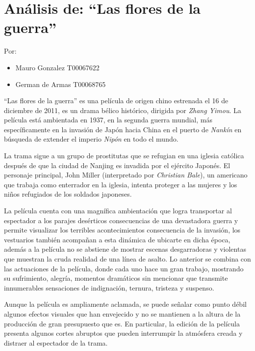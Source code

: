 \documentclass[letterpaper, 12pt]{report}
\begin{document}
\chapter*{Análisis de: ``Las flores de la guerra''}

\noindent\makebox[\linewidth]{\rule{\textwidth}{0.4pt}}

Por:
\begin{itemize}[label=$\triangleright$]
    \item Mauro Gonzalez T00067622
    \item German de Armas T00068765
\end{itemize}

\noindent\makebox[\linewidth]{\rule{\textwidth}{0.4pt}}

\nocite{Pelicula}

``Las flores de la guerra'' es una película de origen chino estrenada el 16 de
diciembre de 2011, es un drama bélico histórico, dirigida por \textit{Zhang Yimou}.
La película está ambientada en 1937, en la segunda guerra mundial, más
específicamente en la invasión de Japón hacia China en el puerto de
\textit{Nankín} en búsqueda de extender el imperio \textit{Nipón} en todo el mundo.

La trama sigue a un grupo de prostitutas que se refugian en
una iglesia católica después de que la ciudad de Nanjing es
invadida por el ejército Japonés. El personaje principal,
John Miller (interpretado por \textit{Christian Bale}), un
americano que trabaja como enterrador en la iglesia,
intenta proteger a las mujeres y los niños refugiados de
los soldados japoneses.

La película cuenta con una magnífica ambientación que logra
transportar al espectador a los parajes desérticos
consecuencias de una devastadora guerra y permite
visualizar los terribles acontecimientos consecuencia de la
invasión, los vestuarios también acompañan a esta dinámica
de ubicarte en dicha época, además a la película no se
abstiene de mostrar escenas desgarradoras y violentas que
muestran la cruda realidad de una línea de asalto. Lo
anterior se combina con las actuaciones de la película,
donde cada uno hace un gran trabajo, mostrando su
sufrimiento, alegría, momentos dramáticos sin mencionar que
transmite innumerables sensaciones de indignación, ternura,
tristeza y suspenso.

Aunque la película es ampliamente aclamada, se puede
señalar como punto débil algunos efectos visuales que han
envejecido y no se mantienen a la altura de la producción
de gran presupuesto que es. En particular, la edición de la
película presenta algunos cortes abruptos que pueden
interrumpir la atmósfera creada y distraer al espectador de
la trama.
\end{document}
